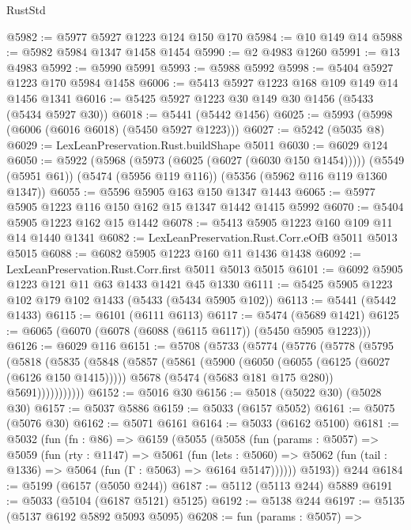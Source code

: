 \begin{lexlean}{RustStd}
\begin{coremodule}
{\begin{coremodule}
{{{{{{{{{{{{{{{{{{{{{{{{{{{{{{{{{{@5982 := @5977 @5927 @1223 @124 @150 @170
@5984 := @10 @149 @14
@5988 := @5982 @5984 @1347 @1458 @1454
@5990 := @2 @4983 @1260
@5991 := @13 @4983
@5992 := @5990 @5991
@5993 := @5988 @5992
@5998 := @5404 @5927 @1223 @170 @5984 @1458
@6006 := @5413 @5927 @1223 @168 @109 @149 @14 @1456 @1341
@6016 := @5425 @5927 @1223 @30 @149 @30 @1456 (@5433 (@5434 @5927 @30))
@6018 := @5441 (@5442 @1456)
@6025 := @5993 (@5998 (@6006 (@6016 @6018) (@5450 @5927 @1223)))
@6027 := @5242 (@5035 @8)
@6029 := LexLeanPreservation.Rust.buildShape @5011
@6030 := @6029 @124
@6050 := @5922
    (@5968 (@5973 (@6025 (@6027 (@6030 @150 @1454)))))
    (@5549 (@5951 @61))
    (@5474 (@5956 @119 @116))
    (@5356 (@5962 @116 @119 @1360 @1347))
@6055 := @5596 @5905 @163 @150 @1347 @1443
@6065 := @5977 @5905 @1223 @116 @150 @162 @15 @1347 @1442 @1415 @5992
@6070 := @5404 @5905 @1223 @162 @15 @1442
@6078 := @5413 @5905 @1223 @160 @109 @11 @14 @1440 @1341
@6082 := LexLeanPreservation.Rust.Corr.eOfB @5011 @5013 @5015
@6088 := @6082 @5905 @1223 @160 @11 @1436 @1438
@6092 := LexLeanPreservation.Rust.Corr.first @5011 @5013 @5015
@6101 := @6092 @5905 @1223 @121 @11 @63 @1433 @1421 @45 @1330
@6111 := @5425 @5905 @1223 @102 @179 @102 @1433 (@5433 (@5434 @5905 @102))
@6113 := @5441 (@5442 @1433)
@6115 := @6101 (@6111 @6113)
@6117 := @5474 (@5689 @1421)
@6125 := @6065 (@6070 (@6078 (@6088 (@6115 @6117)) (@5450 @5905 @1223)))
@6126 := @6029 @116
@6151 := @5708
    (@5733
      (@5774
        (@5776
          (@5778
            (@5795
              (@5818
                (@5835
                  (@5848
                    (@5857
                      (@5861
                        (@5900
                          (@6050 (@6055 (@6125 (@6027 (@6126 @150 @1415)))))
                          @5678
                          (@5474 (@5683 @181 @175 @280))
                          @5691)))))))))))
@6152 := @5016 @30
@6156 := @5018 (@5022 @30) (@5028 @30)
@6157 := @5037 @5886
@6159 := @5033 (@6157 @5052)
@6161 := @5075 (@5076 @30)
@6162 := @5071 @6161
@6164 := @5033 (@6162 @5100)
@6181 := @5032
    (fun (fn : @86) =>
    @6159
      (@5055
        (@5058
          (fun (params : @5057) =>
          @5059
            (fun (rty : @1147) =>
            @5061
              (fun (lets : @5060) =>
              @5062 (fun (tail : @1336) => @5064 (fun (Γ : @5063) => @6164 @5147))))))
        @5193))
    @244
@6184 := @5199 (@6157 (@5050 @244))
@6187 := @5112 (@5113 @244) @5889
@6191 := @5033 (@5104 (@6187 @5121) @5125)
@6192 := @5138 @244
@6197 := @5135 (@5137 @6192 @5892 @5093 @5095)
@6208 := fun (params : @5057) =>
}}}}}}}}}}}}}}}}}}}}}}}}}}}}}}}}}}
\end{coremodule}}
\end{coremodule}
\end{lexlean}
